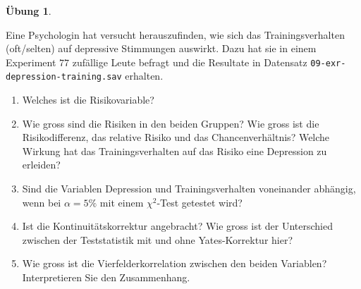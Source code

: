 \documentclass[
]{book}
\providecommand{\tightlist}{%
  \setlength{\itemsep}{0pt}\setlength{\parskip}{0pt}}
\theoremstyle{definition}
\theoremstyle{definition}
\theoremstyle{definition}
\newtheorem{exercise}{Übung}[chapter]
\theoremstyle{definition}
\theoremstyle{remark}
\begin{document}
\begin{exercise}
\protect\hypertarget{exr:depression-training}{}\label{exr:depression-training}\leavevmode

Eine Psychologin hat versucht herauszufinden, wie sich das
Trainingsverhalten (oft/selten) auf depressive Stimmungen auswirkt. Dazu
hat sie in einem Experiment
\(77\) zufällige Leute befragt und die Resultate in Datensatz \texttt{09-exr-depression-training.sav} erhalten.

\begin{enumerate}
\def\labelenumi{\alph{enumi})}
\tightlist
\item
  Welches ist die Risikovariable?
\item
  Wie gross sind die Risiken in den beiden Gruppen? Wie gross ist die
  Risikodifferenz, das relative Risiko und das Chancenverhältnis?
  Welche Wirkung hat das Trainingsverhalten auf das Risiko eine
  Depression zu erleiden?
\item
  Sind die Variablen Depression und Trainingsverhalten voneinander
  abhängig, wenn bei \(\alpha = 5\%\) mit einem \(\chi^2\)-Test getestet wird?
\item
  Ist die Kontinuitätskorrektur angebracht? Wie gross ist der Unterschied zwischen der Teststatistik mit und ohne
  Yates-Korrektur hier?
\item
  Wie gross ist die Vierfelderkorrelation zwischen den beiden
  Variablen? Interpretieren Sie den Zusammenhang.
\end{enumerate}

\end{exercise}
\end{document}
